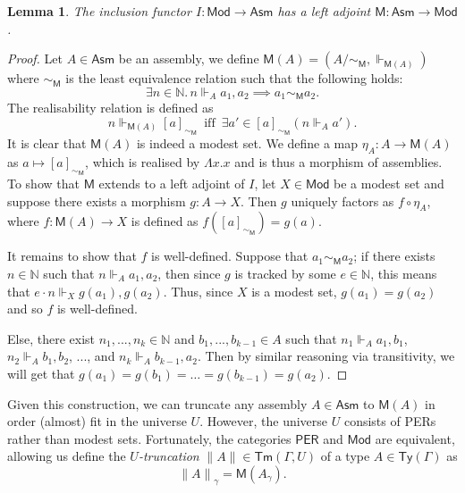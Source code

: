 \documentclass[10pt,a4paper]{article}
\newtheorem{lemma}[theorem]{Lemma}
\theoremstyle{definition}
\theoremstyle{remark}
\renewcommand{\.}{.\,} %
\renewcommand{\:}{:} %
\newcommand{\bN}{\mathbb{N}}
\newcommand{\0}{\mathbf{0}}
\newcommand{\1}{\mathbf{1}}
\newcommand\<\langle
\renewcommand\>\rangle
\newcommand{\Per}{\mathsf{PER}}
\newcommand{\Mod}{\mathsf{Mod}}
\newcommand{\Asm}{\mathsf{Asm}}
\newcommand{\M}{\mathsf{M}}
\newcommand{\Tr}[1]{{\|{#1}\|}}
\newcommand{\Ty}{\mathsf{Ty}}
\newcommand{\Tm}{\mathsf{Tm}}
\newcommand{\U}{U}
\newcommand{\Iff}{\hspace{6pt}\text{iff}\hspace{6pt}}
\theoremstyle{remark}
\begin{document}
\begin{lemma}
The inclusion functor $I : \Mod \to \Asm$ has a left adjoint $\M : \Asm \to \Mod$.
\end{lemma}
\begin{proof}
Let $A \in \Asm$ be an assembly, we define $\M(A) = ( A {/ \!\sim_\M}, \Vdash_{\M(A)})$ where $\sim_\M$ is the least equivalence relation such that the following holds:
\[
\exists n \in \bN \. n \Vdash_A a_1, a_2 \implies a_1 \sim_\M a_2.
\]
The realisability relation is defined as
\[
n \Vdash_{\M(A)} [ a ]_{\sim_\M} \Iff \exists a' \in [ a ]_{\sim_\M} (n \Vdash_A a').
\]
It is clear that $\M(A)$ is indeed a modest set. We define a map $\eta_A : A \to \M(A)$ as $a \mapsto [a]_{\sim_\M}$, which is realised by $\Lambda x . x$ and is thus a morphism of assemblies. To show that $\M$ extends to a left adjoint of $I$, let $X \in \Mod$ be a modest set and suppose there exists a morphism $g : A \to X$. Then $g$ uniquely factors as $f \circ \eta_A$, where $f : \M(A) \to X$ is defined as $f([a]_{\sim_\M}) = g(a)$. 

It remains to show that $f$ is well-defined. Suppose that $a_1 \sim_\M a_2$; if there exists $n \in \bN$ such that $n \Vdash_A a_1, a_2$, then since $g$ is tracked by some $e \in \bN$, this means that $e \cdot n \Vdash_X g(a_1), g(a_2)$. Thus, since $X$ is a modest set, $g(a_1) = g(a_2)$ and so $f$ is well-defined.

Else, there exist $n_1, ..., n_k \in \bN$ and $b_1, ..., b_{k-1} \in A$ such that $n_1 \Vdash_A a_1, b_1$, $n_2 \Vdash_A b_1, b_2$, ..., and $n_k \Vdash_A b_{k-1}, a_2$. Then by similar reasoning via transitivity, we will get that $g(a_1) = g(b_1) = \dots = g(b_{k-1}) = g(a_2)$.
\end{proof}

Given this construction, we can truncate any assembly $A \in \Asm$ to $\M(A)$ in order (almost) fit in the universe $\U$. However, the universe $\U$ consists of PERs rather than modest sets. Fortunately, the categories $\Per$ and $\Mod$ are equivalent, allowing us define the \emph{$U$-truncation} $\|A\| \in \Tm(\Gamma, \U)$ of a type $A \in \Ty(\Gamma)$ as 
\[\Tr{A}_\gamma = \M(A_\gamma).\]
\end{document}
